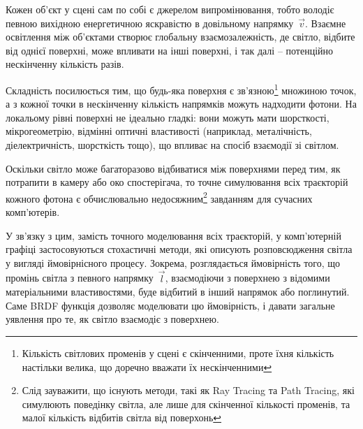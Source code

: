 Кожен об’єкт у сцені сам по собі є джерелом випромінювання, тобто володіє певною вихідною енергетичною яскравістю в довільному напрямку~$\vec{v}$. Взаємне 
освітлення між об’єктами створює глобальну взаємозалежність, де світ\-ло, відбите від однієї поверхні, може впливати на інші поверхні, і так далі -- потенційно нескінченну
 кількість разів.

Складність посилюється тим, що будь-яка поверхня є зв'язною\footnote{Кількість світлових променів у сцені є скінченними, проте їхня кількість настільки велика, що доречно вважати їх нескінченними} множиною точок, а з кожної точки в нескінченну кількість напрямків можуть надходити фотони. На 
локальому рівні поверхні не ідеально гладкі: вони можуть мати шорсткості, мікрогеометрію, відмінні оптичні властивості (наприклад, металічність, діелектричність,
 шорсткість тощо), що впливає на спосіб взаємодії зі світлом.

Оскільки світло може багаторазово відбиватися між поверхнями перед тим, як потрапити в камеру або око спостерігача, то точне симулювання всіх траєкторій кожного 
фотона є обчислювально недосяжним\footnote{Слід зауважити, що існують методи, такі як Ray Tracing та Path Tracing, які симулюють поведінку світла, але лише для скінченної кількості променів, та
малої кількість відбитів світла від поверхонь} завданням для су\-час\-них комп’ютерів.

У зв’язку з цим, замість точного моделювання всіх траєкторій, у комп’ю\-тер\-ній графіці застосовуються стохастичні методи, які описують розповсюдження світла у вигляді
 ймовірнісного процесу. Зокрема, розглядається ймовірність того, що промінь світла з певного напрямку~$\vec{l}$, взаємодіючи з поверхнею з відомими матеріальними 
 властивостями, буде відбитий в інший напрямок або поглинутий. Саме BRDF функція дозволяє моделювати цю ймовірність, і давати загальне уявлення про те, як світло
взаємодіє з поверхнею.

